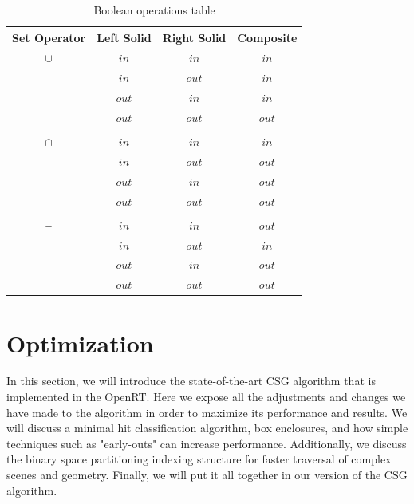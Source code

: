 \documentclass[a4paper,11pt,oneside]{article}
\newcommand{\minus}{\scalebox{0.9}[1.0]{$-$}} %
\begin{document}
\begin{table}[H]
	\centering
	\caption{Boolean operations table}
	\label{section3:boolean_algebra}
	\begin{tabular}{||c c c c||} 
		\hline
		Set Operator & Left Solid & Right Solid & Composite \\ [0.5ex] 
		\hline\hline
		$\cup$       & $in$       & $in$        & $in$      \\
		             & $in$       & $out$       & $in$      \\
		             & $out$      & $in$       & $in$      \\
		             & $out$      & $out$       & $out$     \\
		             &            &             &           \\
		$\cap$       & $in$       & $in$        & $in$      \\
		             & $in$       & $out$       & $out$     \\
		             & $out$      & $in$        & $out$     \\
		             & $out$      & $out$       & $out$     \\
		             &            &             &           \\
		$\minus$     & $in$       & $in$        & $out$     \\
		             & $in$       & $out$       & $in$      \\
		             & $out$      & $in$        & $out$     \\
		             & $out$      & $out$       & $out$     \\		 	   	
		\hline
	\end{tabular}
\end{table}

\section{Optimization}

In this section, we will introduce the state-of-the-art CSG algorithm that is implemented in the OpenRT. Here we expose all the adjustments and changes we have made to the algorithm in order to maximize its performance and results. We will discuss a minimal hit classification algorithm, box enclosures, and how simple techniques such as "early-outs" can increase performance. Additionally, we discuss the binary space partitioning indexing structure for faster traversal of complex scenes and geometry. Finally, we will put it all together in our version of the CSG algorithm.
\end{document}
